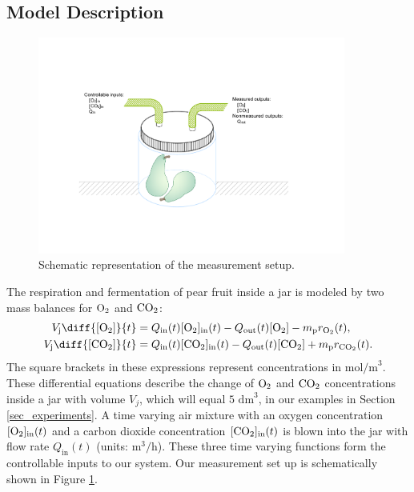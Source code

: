 \subsection{Model Description}
\begin{figure}
	\centering
	\includegraphics[width=0.9\textwidth,trim={2cm 4cm 2cm 5cm,clip}]{figure/paper 2/pear.pdf}
	\caption{Schematic representation of the measurement setup.}
	\label{figpear}
\end{figure}
\label{sec_model}
The respiration and fermentation of pear fruit inside a jar is modeled by two mass balances for $\text{O}_2$ and $\text{CO}_2$:
\begin{equation}
\begin{aligned}
V_\text{j}\diff{\Coxy}{t} &= Q_\text{in}(t)\Coxy_{\text{in}}(t) - Q_\text{out}(t)\Coxy
- m_\text{p}r_{\oxy}(t),\\
V_\text{j}\diff{\Ccoxy}{t} &= Q_\text{in}(t)\Ccoxy_{\text{in}}(t) - Q_\text{out}(t)\Ccoxy
+ m_\text{p}r_{\coxy}(t).
\end{aligned}
\label{respiration}
\end{equation}
The square brackets in these expressions represent concentrations in $\text{mol/m}^3$. These differential equations describe the change of $\text{O}_2$ and $\text{CO}_2$ concentrations inside a jar with volume $V_j$, which will equal $5\text{ dm}^3$, in our examples in Section \ref{sec_experiments}. A time varying air mixture with an oxygen concentration $[\text{O}_2]_{\text{in}}(t)$ and a carbon dioxide concentration $[\text{CO}_2]_{\text{in}}(t)$ is blown into the jar with flow rate $Q_\text{in}(t)$ (units: $\text{m}^3\text{/h}$). These three time varying functions form the controllable inputs to our system. Our measurement set up is schematically shown in Figure \ref{figpear}.
\\
